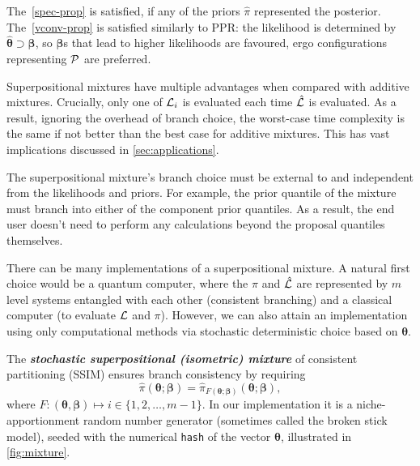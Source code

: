 \documentclass[usenatbib]{mnras}
\begin{document}
The~\cref{spec-prop} is satisfied, if any of the priors $\hat{\pi}$
represented the posterior. The~\cref{vconv-prop} is satisfied
similarly to PPR: the likelihood is determined by
\(\bm\hat{\theta} \supset \bm{\beta}\), so $\bm{\beta}$s that lead to
higher likelihoods are favoured, ergo configurations representing
${\cal P}$ are preferred.

Superpositional mixtures have multiple advantages when compared with
additive mixtures. Crucially, only one of ${\cal L}_{i}$ is evaluated
each time $\hat{\cal L}$ is evaluated. As a result, ignoring the
overhead of branch choice, the worst-case time complexity is the same
if not better than the best case for additive mixtures. This has vast
implications discussed in \cref{sec:applications}.

The superpositional mixture's branch choice must be external to and
independent from the likelihoods and priors. For example, the prior
quantile of the mixture must branch into either of the component prior
quantiles. As a result, the end user doesn't need to perform any
calculations beyond the proposal quantiles themselves.

There can be many implementations of a superpositional mixture. A
natural first choice would be a quantum computer, where the
$\hat{\pi}$ and $\hat{\cal L}$ are represented by \(m\) level systems
entangled with each other (consistent branching) and a classical
computer (to evaluate ${\cal L}$ and $\pi$). However, we can also
attain an implementation using only computational methods via
stochastic deterministic choice based on $\bm{\theta}$.

The \textbf{\emph{stochastic superpositional (isometric) mixture}} of
consistent partitioning (SSIM) ensures branch consistency by requiring
\begin{equation}
\hat{\pi}(\bm{\theta}; \bm{\beta}) = \hat{\pi}_{F(\bm{\theta};
  \bm{\beta})}(\bm{\theta};\bm{\beta}),
\end{equation}
where
$F: (\bm{\theta}, \bm{\beta}) \mapsto i \in \{1, 2, \ldots, m-1\}$. In
our implementation it is a niche-apportionment random number generator
(sometimes called the broken stick model), seeded with the numerical
\texttt{hash} of the vector $\bm{\theta}$, illustrated in
\cref{fig:mixture}.
\end{document}
